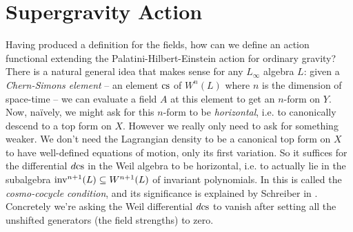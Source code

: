 \documentclass[10pt, oneside]{article}
\begin{document}
\section{Supergravity Action}
Having produced a definition for the fields, how can we define an action functional extending the Palatini-Hilbert-Einstein action for ordinary gravity?  There is a natural general idea that makes sense for any $L_\infty$ algebra $L$: given a \emph{Chern-Simons element} -- an element $\mathrm{cs}$ of $W^n(L)$ where $n$ is the dimension of space-time -- we can evaluate a field $A$ at this element to get an $n$-form on $Y$.  Now, na\"ively, we might ask for this $n$-form to be \emph{horizontal}, i.e. to canonically descend to a top form on $X$.  However we really only need to ask for something weaker.  We don't need the Lagrangian density to be a canonical top form on $X$ to have well-defined equations of motion, only its first variation.  So it suffices for the differential $d\mathrm{cs}$ in the Weil algebra to be horizontal, i.e. to actually lie in the subalgebra $\mathrm{inv}^{n+1}(L) \subseteq W^{n+1}(L)$ of invariant polynomials.  In \cite{DF} this is called the \emph{cosmo-cocycle condition}, and its significance is explained by Schreiber in \cite{Schreiber}.  Concretely we're asking the Weil differential $d\mathrm{cs}$ to vanish after setting all the unshifted generators (the field strengths) to zero.
\end{document}
